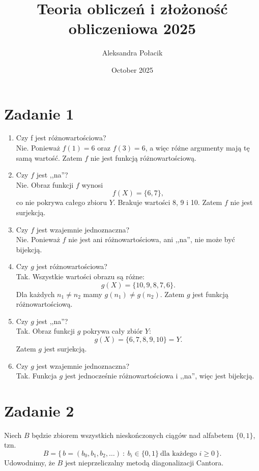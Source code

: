 \documentclass{article}
\title{Teoria obliczeń i złożoność obliczeniowa 2025}
\author{Aleksandra Połacik}
\date{October 2025}
\begin{document}
\maketitle

\section{Zadanie 1}

\begin{enumerate}
    \item Czy f jest różnowartościowa?\\
    Nie. Ponieważ $f(1) = 6$ oraz $f(3) = 6$, a więc różne argumenty mają tę samą wartość. Zatem $f$ nie jest funkcją różnowartościową.
    \item Czy $f$ jest ,,na''?\\
    Nie. Obraz funkcji $f$ wynosi
    \[
    f(X) = \{6,7\},
    \]
    co nie pokrywa całego zbioru $Y$.
    Brakuje wartości 8, 9 i 10.
    Zatem $f$ nie jest surjekcją.
    \item Czy $f$ jest wzajemnie jednoznaczna?\\
    Nie. Ponieważ $f$ nie jest ani różnowartościowa, ani ,,na'', nie może być bijekcją.

    \item Czy $g$ jest różnowartościowa?\\
    Tak. Wszystkie wartości obrazu są różne:
    \[
    g(X)=\{10,9,8,7,6\}.
    \]
    Dla każdych $n_1 \neq n_2$ mamy $g(n_1) \neq g(n_2)$.
    Zatem $g$ jest funkcją różnowartościową.

    \item Czy $g$ jest ,,na''?\\
    Tak. Obraz funkcji $g$ pokrywa cały zbiór $Y$:
    \[
    g(X)=\{6,7,8,9,10\} = Y.
    \]
    Zatem $g$ jest surjekcją.

    \item Czy $g$ jest wzajemnie jednoznaczna?\\
    Tak. Funkcja $g$ jest jednocześnie różnowartościowa i ,,na'', więc jest bijekcją.

\end{enumerate}


\section{Zadanie 2}
Niech \(B\) będzie zbiorem wszystkich nieskończonych ciągów nad alfabetem \(\{0,1\}\), tzn.
\[
B=\{\,b=(b_0,b_1,b_2,\dots)\ :\ b_i\in\{0,1\}\ \text{dla każdego }i\ge0\,\}.
\]
Udowodnimy, że \(B\) jest nieprzeliczalny metodą diagonalizacji Cantora.
\end{document}
